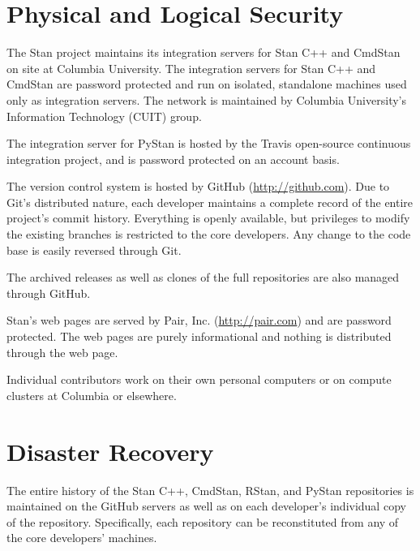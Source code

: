 \section{Physical and Logical Security}

The Stan project maintains its integration servers for Stan C++ and
CmdStan on site at Columbia University. The integration servers for
Stan C++ and CmdStan are password protected and run on isolated,
standalone machines used only as integration servers. The network is
maintained by Columbia University's Information Technology (CUIT)
group.

The integration server for PyStan is hosted by the Travis open-source
continuous integration project, and is password protected on an
account basis.

The version control system is hosted by GitHub
(\url{http://github.com}). Due to Git's distributed nature, each
developer maintains a complete record of the entire project's commit
history. Everything is openly available, but privileges to modify the
existing branches is restricted to the core developers. Any change to
the code base is easily reversed through Git.

The archived releases as well as clones of the full repositories are
also managed through GitHub.

Stan's web pages are served by Pair, Inc. (\url{http://pair.com}) and
are password protected.  The web pages are purely informational and
nothing is distributed through the web page.

Individual contributors work on their own personal computers or on
compute clusters at Columbia or elsewhere.


\section{Disaster Recovery}

The entire history of the Stan C++, CmdStan, RStan, and PyStan
repositories is maintained on the GitHub servers as well as on each
developer's individual copy of the repository. Specifically, each
repository can be reconstituted from any of the core 
developers' machines.

